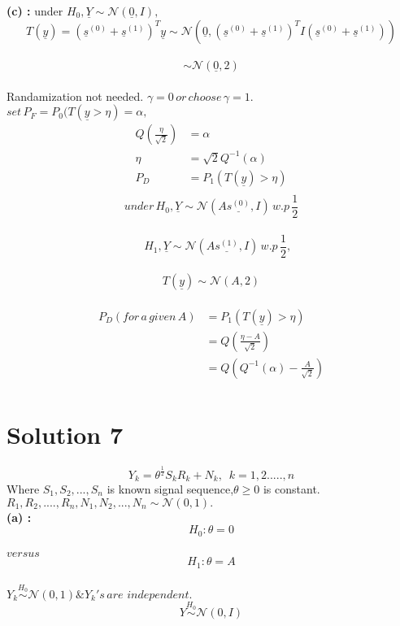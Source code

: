 \documentclass[a4paper,english,12pt]{article}
\begin{document}
\textbf{(c) : }
under $H_0,\underline{Y}\sim\mathcal{N}(\underline{0},I),$\\
$$T(\underline{y})={({\underline{s}}^{(0)} + {\underline{s}}^{(1)})}^T \underline{y} \sim \mathcal{N}(\underline{0},{({\underline{s}}^{(0)} + {\underline{s}}^{(1)})}^T I {({\underline{s}}^{(0)} + {\underline{s}}^{(1)})}) $$\\
$$\sim \mathcal{N}(\underline{0},2)$$\\
Randamization not needed. $\gamma = 0 \, or \, choose \,  \gamma = 1.$\\
$set \,  P_F=P_0(T(\underline{y} > \eta)=\alpha,$\\
\begin{align*}
Q\left( \frac{\eta}{\sqrt{2}}\right)&=\alpha\\
\eta &= \sqrt{2} Q^{-1} \left(\alpha \right)\\
P_D&=P_1(T(\underline{y})>\eta)\\
\end{align*}
$$under \, H_0,\underline{Y}\sim\mathcal{N}(A\underline{s^{(0)}},I)\, w.p \, \frac{1}{2}$$\\
$$\,\,\,\,\,\,\, H_1,\underline{Y}\sim\mathcal{N}(A\underline{s^{(1)}},I) \, w.p \, \frac{1}{2},$$\\
$$T(\underline{y})\sim \mathcal{N}(A,2)$$\\
\begin{align*}
P_D(for\, a\, given\, A)&=P_1(T(\underline{y})>\eta)\\
&=Q\left( \frac{\eta - A}{\sqrt{2}}\right)\\
&=Q\left( Q^{-1}(\alpha)-\frac{A}{\sqrt{2}}\right)\\
\end{align*}

\section{Solution 7}
$$Y_k=\theta^{\frac{1}{2}}S_kR_k+N_k,\,\,\, k=1,2.....,n $$
Where $S_1,S_2,...,S_n$ is known signal sequence,$\theta\geq0$ is constant.
$R_1,R_2,....,R_n,N_1,N_2,...,N_n \sim \mathcal{N}(0,1).$\\
\textbf{(a) : }
$$H_0: \theta=0$$\\
$versus$\\ 
$$H_1:  \theta=A$$\\
$Y_k\overset{H_0}{\sim} \mathcal{N}(0,1) \&  Y_k's \, are \,\, independ
ent.$\\
$$Y\overset{H_0}{\sim} \mathcal{N}(0,I)$$\\
\end{document}
